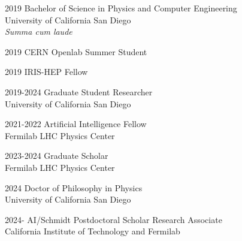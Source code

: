 \noindent
\begin{cv}{}
\begin{cvlist}{}
\item[2019] Bachelor of Science in Physics and Computer Engineering\\
            University of California San Diego\\
            \textit{Summa cum laude}
\item[2019] CERN Openlab Summer Student
\item[2019] IRIS-HEP Fellow
\item[2019-2024] Graduate Student Researcher\\University of California San Diego
\item[2021-2022] Artificial Intelligence Fellow\\Fermilab LHC Physics Center
\item[2023-2024] Graduate Scholar\\Fermilab LHC Physics Center
\item[2024] Doctor of Philosophy in Physics\\University of California San Diego
\item[2024-] AI/Schmidt Postdoctoral Scholar Research Associate\\California Institute of Technology and Fermilab
\end{cvlist}
\end{cv}

\publications

